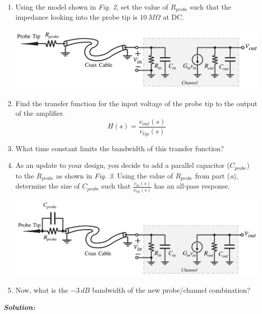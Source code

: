 \documentclass[12pt, fleqn]{article}
\begin{document}
\begin{enumerate}[label=(\roman*)]
    \item
    {
    Using the model shown in \textit{Fig. 2}, set the value of $R_{probe}$ such that the impedance looking into the probe tip is $10\,M \Omega$ at DC.
    
    \includegraphics[scale=0.35, center]{p1f1.PNG}\\
    }
    \item
    {
    Find the transfer function for the input voltage of the probe tip to the output of the amplifier.
    \begin{equation*}
        H(s) = \frac{v_{out}(s)}{v_{tip}(s)}
    \end{equation*}
    }
    \item
    {
    What time constant limits the bandwidth of this transfer function?
    }
    \item
    {
    As an update to your design, you decide to add a parallel capacitor ($C_{probe}$) to the $R_{probe}$ as shown in \textit{Fig. 3}. Using the value of $R_{probe}$ from part (\textit{a}), determine the size of $C_{probe}$ such that $\frac{v_{in}(s)}{v_{tip}(s)}$ has an all-pass response.
    
    \includegraphics[scale=0.35, center]{p1f2.PNG}\\
    }
    \item
    {
    Now, what is the $-3\,dB$ bandwidth of the new probe/channel combination?
    }
\end{enumerate}

\newpage
\noindent
\textbf{\emph{Solution: }}
\end{document}
